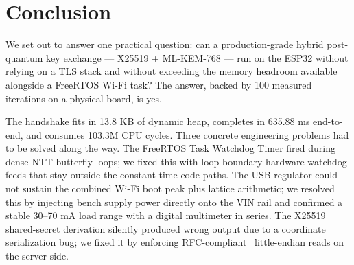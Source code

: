 \documentclass[journal, 10pt]{IEEEtran}
\begin{document}
\begin{table}[htbp]
\caption{Security Threat Matrix}
\begin{center}
\label{tab:threats}
\end{center}
\end{table}

\section{Conclusion}
We set out to answer one practical question: can a production-grade hybrid post-quantum key exchange — X25519 + ML-KEM-768 — run on the ESP32 without relying on a TLS stack and without exceeding the memory headroom available alongside a FreeRTOS Wi-Fi task? The answer, backed by 100 measured iterations on a physical board, is yes.

The handshake fits in 13.8 KB of dynamic heap, completes in 635.88 ms end-to-end, and consumes 103.3M CPU cycles. Three concrete engineering problems had to be solved along the way. The FreeRTOS Task Watchdog Timer fired during dense NTT butterfly loops; we fixed this with loop-boundary hardware watchdog feeds that stay outside the constant-time code paths. The USB regulator could not sustain the combined Wi-Fi boot peak plus lattice arithmetic; we resolved this by injecting bench supply power directly onto the VIN rail and confirmed a stable 30--70 mA load range with a digital multimeter in series. The X25519 shared-secret derivation silently produced wrong output due to a coordinate serialization bug; we fixed it by enforcing RFC-compliant~\cite{b19} little-endian reads on the server side.
\end{document}
